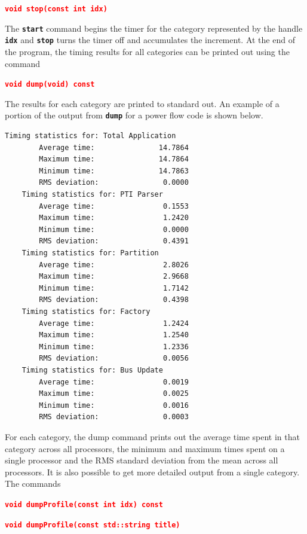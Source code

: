 \documentclass[12pt]{report} %
\begin{document}
\textcolor{red}{\texttt{\textbf{void stop(const int idx)}}}

The \texttt{\textbf{start}} command begins the timer for the category represented by the handle \texttt{\textbf{idx}} and \texttt{\textbf{stop}} turns the timer off and accumulates the increment.
At the end of the program, the timing results for all categories can be printed out using the command

\textcolor{red}{\texttt{\textbf{void dump(void) const}}}

The results for each category are printed to standard out. An example of a portion of the output from \texttt{\textbf{dump}} for a power flow code is shown below.

{
\bfseries
\begin{Verbatim}[commandchars=\\\{\}]
    Timing statistics for: Total Application
        Average time:               14.7864
        Maximum time:               14.7864
        Minimum time:               14.7863
        RMS deviation:               0.0000
    Timing statistics for: PTI Parser
        Average time:                0.1553
        Maximum time:                1.2420
        Minimum time:                0.0000
        RMS deviation:               0.4391
    Timing statistics for: Partition
        Average time:                2.8026
        Maximum time:                2.9668
        Minimum time:                1.7142
        RMS deviation:               0.4398
    Timing statistics for: Factory
        Average time:                1.2424
        Maximum time:                1.2540
        Minimum time:                1.2336
        RMS deviation:               0.0056
    Timing statistics for: Bus Update
        Average time:                0.0019
        Maximum time:                0.0025
        Minimum time:                0.0016
        RMS deviation:               0.0003
\end{Verbatim}
}


For each category, the dump command prints out the average time spent in that category across all processors, the minimum and maximum times spent on a single processor and the RMS standard deviation from the mean across all processors. It is also possible to get more detailed output from a single category. The commands

\textcolor{red}{\texttt{\textbf{void dumpProfile(const int idx) const}}}

\textcolor{red}{\texttt{\textbf{void dumpProfile(const std::string title)}}}
\end{document}
